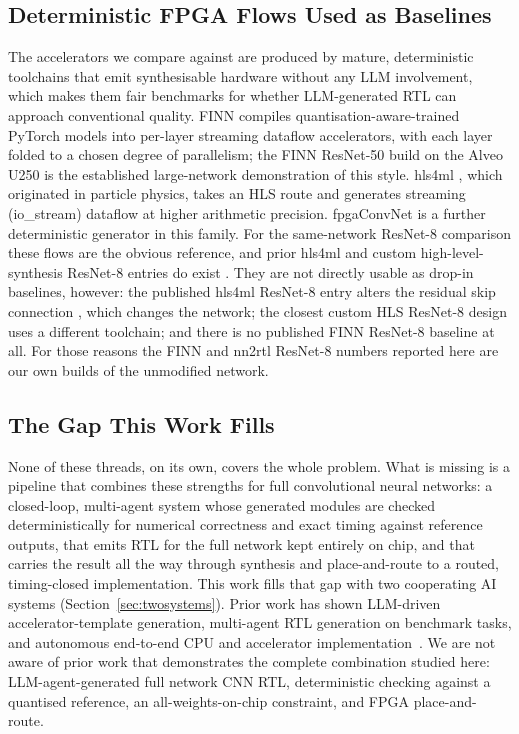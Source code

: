 \documentclass[acmtog,authorversion]{acmart}
\begin{document}
\subsection{Deterministic FPGA Flows Used as Baselines}
The accelerators we compare against are produced by mature, deterministic toolchains that emit synthesisable hardware without any LLM involvement, which makes them fair benchmarks for whether LLM-generated RTL can approach conventional quality. FINN \cite{umuroglu2017finn, blott2018finnr} compiles quantisation-aware-trained PyTorch \cite{paszke2019} models into per-layer streaming dataflow accelerators, with each layer folded to a chosen degree of parallelism; the FINN ResNet-50 build on the Alveo U250 \cite{petrica2020} is the established large-network demonstration of this style. hls4ml \cite{schulte2026hls4ml, duarte2018hls4ml}, which originated in particle physics, takes an HLS route and generates streaming (io\_stream) dataflow at higher arithmetic precision. fpgaConvNet \cite{venieris_fpgaconvnet} is a further deterministic generator in this family. For the same-network ResNet-8 comparison these flows are the obvious reference, and prior hls4ml and custom high-level-synthesis ResNet-8 entries do exist \cite{tailor2023, minnella2023}. They are not directly usable as drop-in baselines, however: the published hls4ml ResNet-8 entry alters the residual skip connection \cite{tailor2023}, which changes the network; the closest custom HLS ResNet-8 design \cite{minnella2023} uses a different toolchain; and there is no published FINN ResNet-8 baseline at all. For those reasons the FINN and nn2rtl ResNet-8 numbers reported here are our own builds of the unmodified network.

\subsection{The Gap This Work Fills}
None of these threads, on its own, covers the whole problem. What is missing is a pipeline that combines these strengths for full convolutional neural networks: a closed-loop, multi-agent system whose generated modules are checked deterministically for numerical correctness and exact timing against reference outputs, that emits RTL for the full network kept entirely on chip, and that carries the result all the way through synthesis and place-and-route to a routed, timing-closed implementation. This work fills that gap with two cooperating AI systems (Section~\ref{sec:twosystems}). Prior work has shown LLM-driven accelerator-template generation, multi-agent RTL generation on benchmark tasks, and autonomous end-to-end CPU and accelerator implementation~\cite{fu2023gpt4aigchip, verkor2026, verkor2026dc2, vungarala2025tpugen, wang2025rtlsquad, zhao2024mage}. We are not aware of prior work that demonstrates the complete combination studied here: LLM-agent-generated full network CNN RTL, deterministic checking against a quantised reference, an all-weights-on-chip constraint, and FPGA place-and-route.
\end{document}
